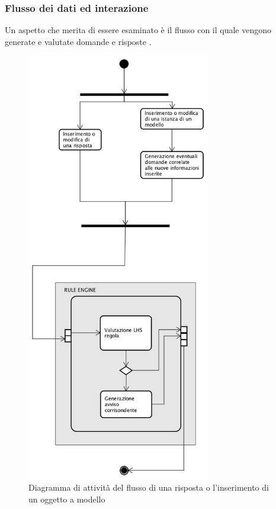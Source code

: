 \newpage
\subsubsection{Flusso dei dati ed interazione}

 Un aspetto che merita di essere esaminato è il flusso con il quale vengono generate e valutate domande e risposte .
\begin{figure}[H]
	\begin{center}
		\includegraphics[width=8cm]{Pics/diagramma_attivita_risposte.png}
		\caption{Diagramma di attività del flusso di una risposta o l'inserimento di un oggetto a modello}
		\label{fig:DiagrammaAttivitaRisposte}
	\end{center}
\end{figure}

